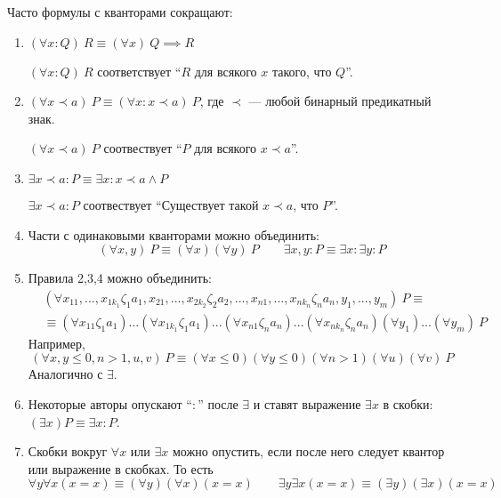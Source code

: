 Часто формулы с кванторами сокращают:
\begin{enumerate}
  \item{}$(\forall x:Q)~R\equiv (\forall x)~Q\implies R$

  $(\forall x:Q)~R$ соответствует ``$R$ для всякого $x$ такого, что $Q$''.

  \item{}$(\forall x\prec a)~P\equiv (\forall x:x\prec a)~P$,
  где $\prec$ --- любой бинарный предикатный знак.

  ${(\forall x\prec a)~P}$ соотвествует
  ``$P$ для всякого $x\prec a$''.

  \item{}$\exists x\prec a:P\equiv\exists x:x\prec a\land P$

  $\exists x\prec a:P$ соотвествует
  ``Существует такой $x\prec a$, что $P$''.

  \item{}Части с одинаковыми кванторами можно объединить:
  \[
    (\forall x,y)~P\equiv(\forall x)(\forall y)~P\qquad
    \exists x,y:P\equiv\exists x:\exists y:P
  \]

  \item{}Правила 2,3,4 можно объединить:
  \[
    \begin{aligned}
       & (\forall x_{11},...,x_{1k_1}\zeta_1a_1,x_{21},...,x_{2k_2}\zeta_2a_2,...,
      x_{n1},...,x_{nk_n}\zeta_na_n,y_1,...,y_{m})~P\equiv                         \\
       & \equiv (\forall x_{11}\zeta_{1}a_1)...(\forall x_{1k_1}\zeta_1a_1)...
      (\forall x_{n1}\zeta_{n}a_{n})...(\forall x_{nk_{n}}\zeta_{n}a_{n})
      (\forall y_1)...(\forall y_{m})~P
    \end{aligned}
  \]
  Например,
  \[
    (\forall x,y\leq 0,n>1,u,v)~P\equiv (\forall x\leq 0)(\forall y\leq 0)
    (\forall n>1)(\forall u)(\forall v)~P
  \]
  Аналогично с $\exists$.

  \item{}Некоторые авторы опускают ``$:$'' после $\exists$ и
  ставят выражение $\exists x$ в скобки:
  $(\exists x)P\equiv \exists x:P$.

  \item{}Скобки вокруг $\forall x$ или $\exists x$ можно опустить,
  если после него следует квантор или выражение в скобках.
  То есть
  \[
    \forall y\forall x (x=x)\equiv (\forall y)(\forall x)(x=x)\qquad 
    \exists y\exists x(x=x)\equiv (\exists y)(\exists x)(x=x)
  \]
\end{enumerate}

